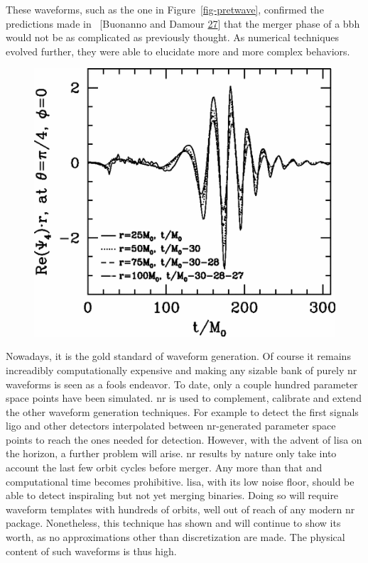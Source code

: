 \documentclass[
  11pt,
  a4paper,
  DIV=11,
  numbers=noendperiod,
  twoside]{scrreprt}
\DeclareRobustCommand{\[}{\begin{equation}}
\DeclareRobustCommand{\]}{\end{equation}}
\begin{document}
These waveforms, such as the one in Figure~\ref{fig-pretwave}, confirmed
the predictions made in ~{[}Buonanno and Damour
\protect\hyperlink{ref-Buonanno:2000ef}{27}{]} that the merger phase of
a \gls{bbh} would not be as complicated as previously thought. As
numerical techniques evolved further, they were able to elucidate more
and more complex behaviors.

\begin{figure}


{\centering \includegraphics{./pretwave.png}

}

\end{figure}

Nowadays, it is the gold standard of waveform generation. Of course it
remains increadibly computationally expensive  and making any sizable bank of purely \gls{nr} waveforms is
seen as a fools endeavor. To date, only a couple hundred parameter space
points have been simulated. \gls{nr} is used to complement, calibrate
and extend the other waveform generation techniques. For example to
detect the first signals \gls{ligo} and other detectors interpolated
between \gls{nr}-generated parameter space points to reach the ones
needed for detection. However, with the advent of \gls{lisa} on the
horizon, a further problem will arise. \gls{nr} results by nature only
take into account the last few orbit cycles before merger. Any more than
that and computational time becomes prohibitive. \gls{lisa}, with its
low noise floor, should be able to detect inspiraling but not yet
merging binaries. Doing so will require waveform templates with hundreds
of orbits, well out of reach of any modern \gls{nr} package.
Nonetheless, this technique has shown and will continue to show its
worth, as no approximations other than discretization are made. The
physical content of such waveforms is thus high.
\end{document}
